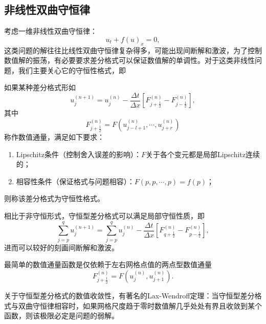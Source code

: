 \documentclass[a4paper,10pt]{ctexart}
\begin{document}
\subsection{非线性双曲守恒律}
考虑一维非线性双曲守恒律：
\begin{equation}
    u_t + f(u)_x = 0,
\end{equation}
这类问题的解往往比线性双曲守恒律复杂得多，可能出现间断解和激波，为了控制数值解的振荡，有必要要求差分格式可以保证数值解的单调性。对于这类非线性问题，我们主要关心它的守恒性格式，即
\begin{definition}
    如果某种差分格式形如
    \begin{equation}
        u^{(n+1)}_j = u^{(n)}_j - \frac{\Delta t}{\Delta x} [F^{(n)}_{j+\frac{1}{2}} - F^{(n)}_{j-\frac{1}{2}}],
    \end{equation}
    其中
    \begin{equation}
        F^{(n)}_{j+\frac{1}{2}} = F(u_{j-l+1}^{(n)}, \cdots ,u_{j+r}^{(n)})
    \end{equation}
    称作数值通量，满足如下要求：
    \begin{enumerate}
        \item Lipschitz条件（控制舍入误差的影响）：$ F $关于各个变元都是局部Lipschitz连续的；
        \item 相容性条件（保证格式与问题相容）：$ F(p,p,\cdots ,p) = f(p) $；
    \end{enumerate}
    则称该差分格式为守恒性格式。
\end{definition}
相比于非守恒形式，守恒型差分格式可以满足局部守恒性质，即
\begin{equation}
    \sum_{j=p}^q u^{(n+1)}_j = \sum_{j=p}^q u^{(n)}_j - \frac{\Delta t}{\Delta x} [F^{(n)}_{q+\frac{1}{2}} - F^{(n)}_{p-\frac{1}{2}}],
\end{equation}
进而可以较好的刻画间断解和激波。

最简单的数值通量函数是仅依赖于左右网格点值的两点型数值通量
\[
    F^{(n)}_{j+\frac{1}{2}} = F(u_j^{(n)},u_{j+1}^{(n)}).  
\]

关于守恒型差分格式的数值收敛性，有著名的Lax-Wendroff定理：当守恒型差分格式与双曲守恒律相容时，如果网格尺度趋于零时数值解几乎处处有界且收敛到某个函数，则该极限必定是问题的弱解。
\end{document}
